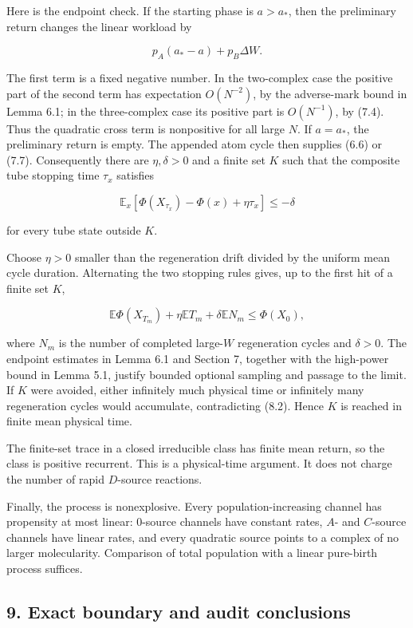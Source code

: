 Here is the endpoint check. If the starting phase is \(a>a_*\), then the
preliminary return changes the linear workload by

\[
 p_A(a_*-a)+p_B\Delta W.
\]

The first term is a fixed negative number. In the two-complex case the
positive part of the second term has expectation \(O(N^{-2})\), by the
adverse-mark bound in Lemma 6.1; in the three-complex case its positive
part is \(O(N^{-1})\), by (7.4). Thus the quadratic cross term is
nonpositive for all large \(N\). If \(a=a_*\), the preliminary return is
empty. The appended atom cycle then supplies (6.6) or (7.7).
Consequently there are \(\eta,\delta>0\) and a finite set \(K\) such
that the composite tube stopping time \(\tau_x\) satisfies

\[
 \mathbb E_x\!\left[
 \Phi(X_{\tau_x})-\Phi(x)+\eta\tau_x
 \right]\le-\delta
\tag{8.1}
\]

for every tube state outside \(K\).

Choose \(\eta>0\) smaller than the regeneration drift divided by the
uniform mean cycle duration. Alternating the two stopping rules gives,
up to the first hit of a finite set \(K\),

\[
 \mathbb E\Phi(X_{T_m})
 +\eta\mathbb E T_m
 +\delta\mathbb E N_m
 \le\Phi(X_0),
\tag{8.2}
\]

where \(N_m\) is the number of completed large-\(W\) regeneration cycles
and \(\delta>0\). The endpoint estimates in Lemma 6.1 and Section 7,
together with the high-power bound in Lemma 5.1, justify bounded
optional sampling and passage to the limit. If \(K\) were avoided,
either infinitely much physical time or infinitely many regeneration
cycles would accumulate, contradicting (8.2). Hence \(K\) is reached in
finite mean physical time.

The finite-set trace in a closed irreducible class has finite mean
return, so the class is positive recurrent. This is a physical-time
argument. It does not charge the number of rapid \(D\)-source reactions.

Finally, the process is nonexplosive. Every population-increasing
channel has propensity at most linear: \(0\)-source channels have
constant rates, \(A\)- and \(C\)-source channels have linear rates, and
every quadratic source points to a complex of no larger molecularity.
Comparison of total population with a linear pure-birth process
suffices.

\subsection{9. Exact boundary and audit
conclusions}

